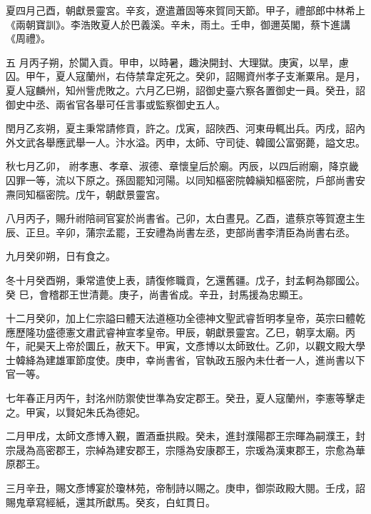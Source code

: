 \begin{pinyinscope}
 夏四月己酉，朝獻景靈宮。辛亥，遼遣蕭固等來賀同天節。甲子，禮部郎中林希上《兩朝寶訓》。李浩敗夏人於巴義溪。辛未，雨土。壬申，御邇英閣，蔡卞進講《周禮》。



 五
 月丙子朔，於闐入貢。甲申，以時暑，趣決開封、大理獄。庚寅，以旱，慮囚。甲午，夏人寇蘭州，右侍禁韋定死之。癸卯，詔賜資州孝子支漸粟帛。是月，夏人寇麟州，知州訾虎敗之。六月乙巳朔，詔御史臺六察各置御史一員。癸丑，詔御史中丞、兩省官各舉可任言事或監察御史五人。



 閏月乙亥朔，夏主秉常請修貢，許之。戊寅，詔陜西、河東毋輒出兵。丙戌，詔內外文武各舉應武舉一人。汴水溢。丙申，太師、守司徒、韓國公富弼薨，謚文忠。



 秋七月乙卯，
 祔孝惠、孝章、淑德、章懷皇后於廟。丙辰，以四后祔廟，降京畿囚罪一等，流以下原之。孫固罷知河陽。以同知樞密院韓縝知樞密院，戶部尚書安燾同知樞密院。戊午，朝獻景靈宮。



 八月丙子，賜升祔陪祠官宴於尚書省。己卯，太白晝見。乙酉，遣蔡京等賀遼主生辰、正旦。辛卯，蒲宗孟罷，王安禮為尚書左丞，吏部尚書李清臣為尚書右丞。



 九月癸卯朔，日有食之。



 冬十月癸酉朔，秉常遣使上表，請復修職貢，乞還舊疆。戊子，封孟軻為鄒國公。癸
 巳，會稽郡王世清薨。庚子，尚書省成。辛丑，封馬援為忠顯王。



 十二月癸卯，加上仁宗謚曰體天法道極功全德神文聖武睿哲明孝皇帝，英宗曰體乾應歷隆功盛德憲文肅武睿神宣孝皇帝。甲辰，朝獻景靈宮。乙巳，朝享太廟。丙午，祀昊天上帝於圜丘，赦天下。甲寅，文彥博以太師致仕。乙卯，以觀文殿大學士韓絳為建雄軍節度使。庚申，幸尚書省，官執政五服內未仕者一人，進尚書以下官一等。



 七年春正月丙午，封洺州防禦使世準為安定郡王。癸丑，夏人寇蘭州，李憲等擊走之。甲寅，以賢妃朱氏為德妃。



 二月甲戌，太師文彥博入覲，置酒垂拱殿。癸未，進封濮陽郡王宗暉為嗣濮王，封宗晟為高密郡王，宗綽為建安郡王，宗隱為安康郡王，宗瑗為漢東郡王，宗愈為華原郡王。



 三月辛丑，賜文彥博宴於瓊林苑，帝制詩以賜之。庚申，御崇政殿大閱。壬戌，詔賜鬼章寫經紙，還其所獻馬。癸亥，白虹貫日。




\end{pinyinscope}
